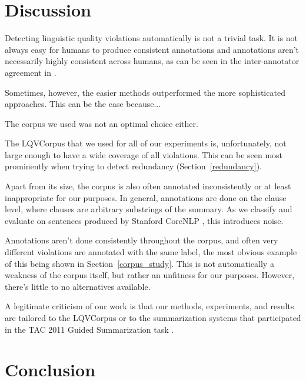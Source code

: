 \documentclass[a4paper,10pt]{scrartcl}
\theoremstyle{style}
\begin{document}
\section{Discussion}
\label{discussion}
Detecting linguistic quality violations automatically is not a trivial task. It is not always easy for humans to produce consistent annotations and annotations aren't necessarily highly consistent across humans, as can be seen in the inter-annotator agreement in \cite{friedrichlqvsumm}.

Sometimes, however, the easier methods outperformed the more sophisticated approaches. This can be the case because...


The corpus we used was not an optimal choice either.

The LQVCorpus that we used for all of our experiments is, unfortunately, not large enough to have a wide coverage of all violations. This can be seen most prominently when trying to detect redundancy (Section~\ref{redundancy}).

Apart from its size, the corpus is also often annotated inconsistently or at least inappropriate for our purposes. In general, annotations are done on the clause level, where clauses are arbitrary substrings of the summary. As we classify and evaluate on sentences produced by Stanford CoreNLP \citep{manning-EtAl:2014:P14-5}, this introduces noise.

Annotations aren't done consistently throughout the corpus, and often very different violations are annotated with the same label, the most obvious example of this being shown in Section~\ref{corpus_study}. This is not automatically a weakness of the corpus itself, but rather an unfitness for our purposes.
However, there's little to no alternatives available.

A legitimate criticism of our work is that our methods, experiments, and results are tailored to the LQVCorpus or to the summarization systems that participated in the TAC 2011 Guided Summarization task \citep{owczarzak2011overview}.



\section{Conclusion} %
\label{conclusion}
\end{document}
